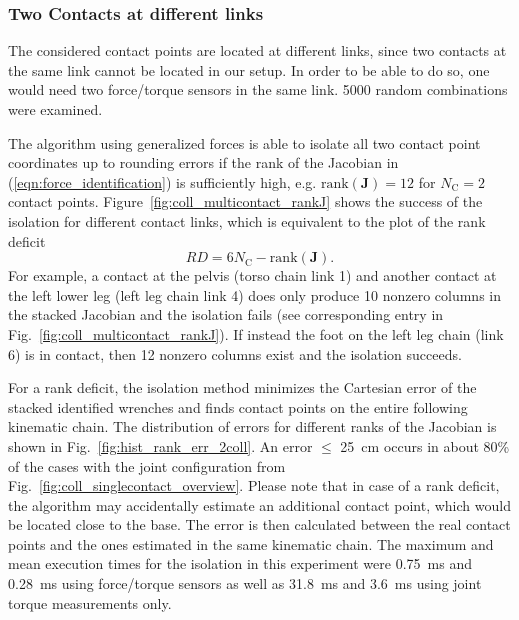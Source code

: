\subsubsection{Two Contacts at different links}

The considered contact points are located at different links, since two contacts at the same link cannot be located in our setup. In order to be able to do so, one would need two force/torque sensors in the same link.
5000 random combinations were examined.

The algorithm using generalized forces is able to isolate all two contact point coordinates up to rounding errors if the rank of the Jacobian in (\ref{eqn:force_identification}) is sufficiently high, e.g. $\mathrm{rank}(\bm{J})=12$ for $N_\mathrm{C}=2$ contact points.
Figure~\ref{fig:coll_multicontact_rankJ} shows the success of the isolation for different contact links, which is equivalent to the plot of the rank deficit
\begin{equation}
RD=6N_\mathrm{C}-\mathrm{rank}(\bm{J}).
\label{eqn:rank_deficit}
\end{equation}
For example, a contact at the pelvis (torso chain link 1) and another contact at the left lower leg (left leg chain link 4) does only produce 10 nonzero columns in the stacked Jacobian and the isolation fails (see corresponding entry in Fig.~\ref{fig:coll_multicontact_rankJ}).
If instead the foot on the left leg chain (link 6) is in contact, then 12 nonzero columns exist and the isolation succeeds.

For a rank deficit, the isolation method minimizes the Cartesian error of the stacked identified wrenches and finds contact points on the entire following kinematic chain. 
The distribution of errors for different ranks of the Jacobian is shown in Fig.~\ref{fig:hist_rank_err_2coll}.
An error $\leq$ 25~cm occurs in about 80\% of the cases with the joint configuration from Fig.~\ref{fig:coll_singlecontact_overview}.
Please note that in case of a rank deficit, the algorithm may accidentally estimate an additional contact point, which would be located close to the base.
The error is then calculated between the real contact points and the ones estimated in the same kinematic chain.
The maximum and mean execution times for the isolation in this experiment were 0.75~ms and 0.28~ms using force/torque sensors as well as 31.8~ms and 3.6~ms using joint torque measurements only.

